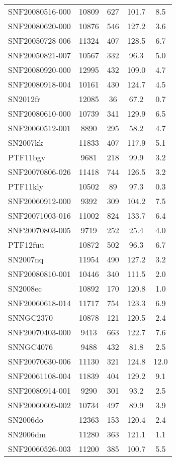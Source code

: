 \begin{longtable}{lcccc}
SNF20080516-000 & 10809 & 627 & 101.7 & 8.5 \\
SNF20080620-000 & 10876 & 546 & 127.2 & 3.6 \\
SNF20050728-006 & 11324 & 407 & 128.5 & 6.7 \\
SNF20050821-007 & 10567 & 332 & 96.3 & 5.0 \\
SNF20080920-000 & 12995 & 432 & 109.0 & 4.7 \\
SNF20080918-004 & 10161 & 430 & 124.7 & 4.5 \\
SN2012fr & 12085 & 36 & 67.2 & 0.7 \\
SNF20080610-000 & 10739 & 341 & 129.9 & 6.5 \\
SNF20060512-001 & 8890 & 295 & 58.2 & 4.7 \\
SN2007kk & 11833 & 407 & 117.9 & 5.1 \\
PTF11bgv & 9681 & 218 & 99.9 & 3.2 \\
SNF20070806-026 & 11418 & 744 & 126.5 & 3.2 \\
PTF11kly & 10502 & 89 & 97.3 & 0.3 \\
SNF20060912-000 & 9392 & 309 & 104.2 & 7.5 \\
SNF20071003-016 & 11002 & 824 & 133.7 & 6.4 \\
SNF20070803-005 & 9719 & 252 & 25.4 & 4.0 \\
PTF12fuu & 10872 & 502 & 96.3 & 6.7 \\
SN2007nq & 11954 & 490 & 127.2 & 3.2 \\
SNF20080810-001 & 10446 & 340 & 111.5 & 2.0 \\
SN2008ec & 10892 & 170 & 120.8 & 1.0 \\
SNF20060618-014 & 11717 & 754 & 123.3 & 6.9 \\
SNNGC2370 & 10878 & 121 & 120.5 & 2.4 \\
SNF20070403-000 & 9413 & 663 & 122.7 & 7.6 \\
SNNGC4076 & 9488 & 432 & 81.8 & 2.5 \\
SNF20070630-006 & 11130 & 321 & 124.8 & 12.0 \\
SNF20061108-004 & 11839 & 404 & 129.2 & 9.1 \\
SNF20080914-001 & 9290 & 301 & 93.2 & 2.5 \\
SNF20060609-002 & 10734 & 497 & 89.9 & 3.9 \\
SN2006do & 12363 & 153 & 120.4 & 2.4 \\
SN2006dm & 11280 & 363 & 121.1 & 1.1 \\
SNF20060526-003 & 11200 & 385 & 100.7 & 5.5 \\

\end{longtable}
